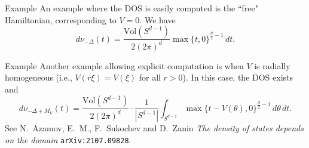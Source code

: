 \documentclass{beamer}
\numberwithin{equation}{section}
\theoremstyle{plain}
\theoremstyle{plain}
\theoremstyle{definition}
\theoremstyle{plain}
\theoremstyle{plain}
\theoremstyle{definition}
\newcommand{\Vol}{\mathrm{Vol}}
\newcommand{\Rl}{\mathbb{R}}
\begin{document}
\begin{frame}{Example}
    An example where the DOS is easily computed is the ``free" Hamiltonian, corresponding to $V = 0$. We have
    \begin{equation*}
        d\nu_{-\Delta}(t) = \frac{\Vol(S^{d-1})}{2(2\pi)^d}\max\{t,0\}^{\frac{d}{2}-1}\,dt.
    \end{equation*}
\end{frame}

\begin{frame}{Example}
    Another example allowing explicit computation is when $V$ is radially homogeneous (i.e., $V(r\xi) = V(\xi)$ for all $r>0$). In this case, the DOS exists and 
    \[
        d\nu_{-\Delta+M_V}(t) = \frac{\Vol(S^{d-1})}{2(2\pi)^d}\cdot \frac{1}{|S^{d-1}|}\int_{S^{d-1}} \max\{t-V(\theta),0\}^{\frac{d}{2}-1}\,d\theta \,dt.
    \]
    See N.~Azamov, E.~M., F.~Sukochev and D.~Zanin \emph{The density of states depends on the domain} \texttt{arXiv:2107.09828}.
\end{frame}

\end{document}
